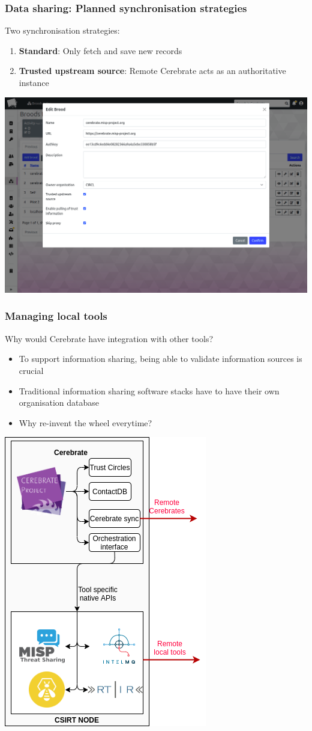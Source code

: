 \begin{frame}
\frametitle{Data sharing: Planned synchronisation strategies}
Two synchronisation strategies:
    \begin{enumerate}
        \item \textbf{Standard}: Only fetch and save new records
        \item \textbf{Trusted upstream source}: Remote Cerebrate acts as an authoritative instance
    \end{enumerate}
    \begin{center}
        \includegraphics[width=0.7\linewidth]{pictures/brood-edit.png}
    \end{center}
\end{frame}

\begin{frame}
\frametitle{Managing local tools}
Why would Cerebrate have integration with other tools?
    \begin{itemize}
        \item To support information sharing, being able to validate information sources is crucial
        \item Traditional information sharing software stacks have to have their own organisation database
        \item Why re-invent the wheel everytime?
    \end{itemize}
    \begin{center}
        \includegraphics[width=0.2\linewidth]{pictures/software-stack.png}
    \end{center}
\end{frame}

